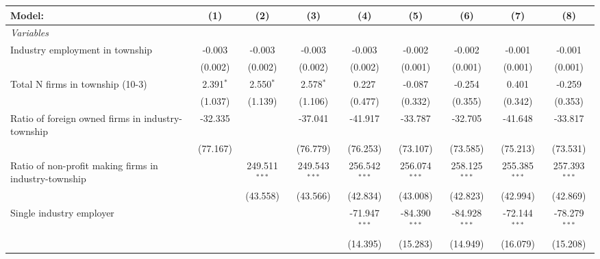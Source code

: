 \begingroup
\centering
\begin{tabular}{lcccccccc}
   \tabularnewline \midrule \midrule
   Model:                                                & (1)         & (2)             & (3)             & (4)             & (5)             & (6)             & (7)             & (8)\\  
   \midrule
   \emph{Variables}\\
   Industry employment in township                       & -0.003      & -0.003          & -0.003          & -0.003          & -0.002          & -0.002          & -0.001          & -0.001\\   
                                                         & (0.002)     & (0.002)         & (0.002)         & (0.002)         & (0.001)         & (0.001)         & (0.001)         & (0.001)\\   
   Total N firms in township (10-3)                      & 2.391$^{*}$ & 2.550$^{*}$     & 2.578$^{*}$     & 0.227           & -0.087          & -0.254          & 0.401           & -0.259\\   
                                                         & (1.037)     & (1.139)         & (1.106)         & (0.477)         & (0.332)         & (0.355)         & (0.342)         & (0.353)\\   
   Ratio of foreign owned firms in industry-township     & -32.335     &                 & -37.041         & -41.917         & -33.787         & -32.705         & -41.648         & -33.817\\   
                                                         & (77.167)    &                 & (76.779)        & (76.253)        & (73.107)        & (73.585)        & (75.213)        & (73.531)\\   
   Ratio of non-profit making firms in industry-township &             & 249.511$^{***}$ & 249.543$^{***}$ & 256.542$^{***}$ & 256.074$^{***}$ & 258.125$^{***}$ & 255.385$^{***}$ & 257.393$^{***}$\\   
                                                         &             & (43.558)        & (43.566)        & (42.834)        & (43.008)        & (42.823)        & (42.994)        & (42.869)\\   
   Single industry employer                              &             &                 &                 & -71.947$^{***}$ & -84.390$^{***}$ & -84.928$^{***}$ & -72.144$^{***}$ & -78.279$^{***}$\\   
                                                         &             &                 &                 & (14.395)        & (15.283)        & (14.949)        & (16.079)        & (15.208)\\   

\end{tabular}
